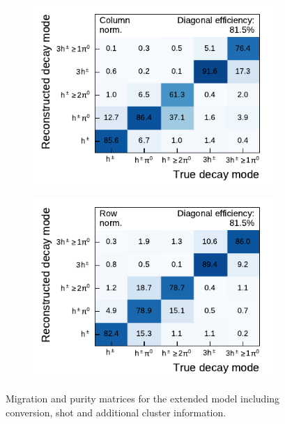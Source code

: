\begin{figure}[!ht]
  \begin{subfigure}{0.48\textwidth}
    \centering
    \includegraphics{./figures/decay_mode_classification/combined_sub_e_moments_shots_conv_ptcut_1_5/mig_mat.pdf}
  \end{subfigure}\hfill
  \begin{subfigure}{0.48\textwidth}
    \centering
    \includegraphics{./figures/decay_mode_classification/combined_sub_e_moments_shots_conv_ptcut_1_5/comp_mat.pdf}
  \end{subfigure}
  \caption{Migration and purity matrices for the extended model including
    conversion, shot and additional cluster information. }
  \label{fig:decay_mode_combined}
\end{figure}

